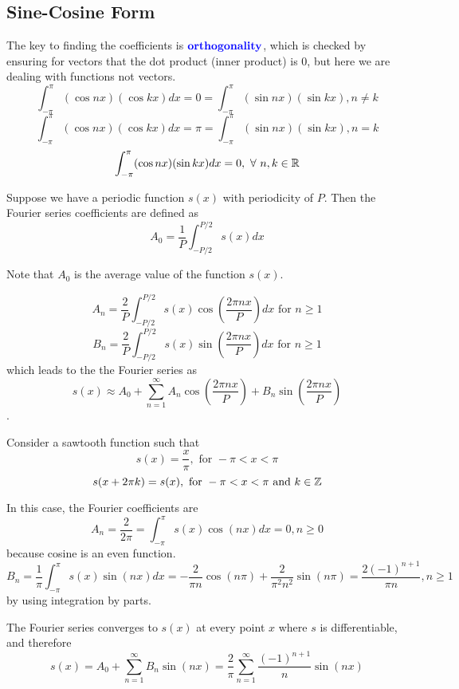 \documentclass[12pt]{scrartcl}
\begin{document}
\subsection{Sine-Cosine Form}

\begin{note}
    The key to finding the coefficients is  $\textbf{\color{blue} orthogonality}$, which is checked by ensuring for vectors that the dot product (inner product) is 0, but here we are dealing with functions not vectors.
\[\int_{-\pi}^\pi (\cos nx)(\cos kx) dx = 0 = \int_{-\pi}^\pi (\sin nx)(\sin kx), n \neq k \]
\[\int_{-\pi}^\pi (\cos nx)(\cos kx) dx = \pi = \int_{-\pi}^\pi (\sin nx)(\sin kx), n = k \]
\[\int_{-\pi}^\pi (\cos nx)(\sin kx) dx = 0 , \ \forall \ n, k \in \mathbb R\]
\end{note}

\begin{lemma}
    Suppose we have a periodic function $s(x)$ with periodicity of $P$. Then the Fourier series coefficients are defined as 
    \[A_0 = \frac{1}{P}\int_{-P/2}^{P/2}s(x) dx\]

    Note that $A_0$ is the average value of the function $s(x)$.
    
    \[A_n = \frac{2}{P}\int_{-P/2}^{P/2} s(x) \cos(\frac{2\pi nx}{P}) dx \text{ for } n \geq 1\]
    \[B_n = \frac{2}{P}\int_{-P/2}^{P/2} s(x) \sin(\frac{2\pi nx}{P}) dx \text{ for } n \geq 1\]
    which leads to the the Fourier series as 
    \[s(x) \approx A_0 + \sum_{n=1}^\infty A_n \cos(\frac{2\pi n x}{P}) + B_n \sin(\frac{2\pi n x}{P})\]. 
\end{lemma}

\begin{example}
    Consider a sawtooth function such that 
    \[s(x) = \frac{x}{\pi}, \text { for } -\pi < x < \pi\]
    \[s(x + 2\pi k) = s(x), \text{ for } -\pi < x < \pi \text{ and } k \in \mathbb Z\]

In this case, the Fourier coefficients are 
\[A_n = \frac{2}{2\pi} = \int_{-\pi}^\pi s(x) \cos(nx) dx = 0, n \geq 0\] because cosine is an even function.
\[B_n = \frac{1}{\pi}\int_{-\pi}^\pi s(x) \sin(nx) dx = -\frac{2}{\pi n}\cos(n\pi) + \frac{2}{\pi^2n^2}\sin(n\pi) = \frac{2(-1)^{n+1}}{\pi n}, n \geq 1\]
by using integration by parts.

The Fourier series converges to $s(x)$ at every point $x$ where $s$ is differentiable, and therefore 
\[s(x) = A_0 + \sum_{n=1}^\infty B_n \sin(nx) = \frac{2}{\pi}\sum_{n=1}^\infty \frac{(-1)^{n+1}}{n}\sin(nx)\]
\end{example}
\end{document}
